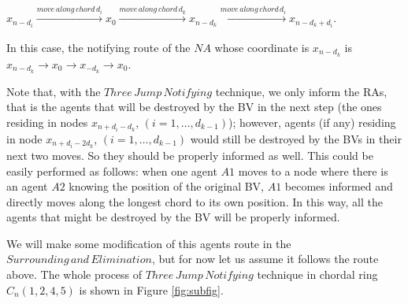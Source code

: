$x_{n-d_i}\xrightarrow [] {move\,along\,chord\,d_i}x_0\xrightarrow [] {move\,along\,chord\,d_k}x_{n-d_k}\xrightarrow []{move\,along\,chord\,d_i}x_{n-d_k+d_i}$.
 
 In this case, the notifying route of the $NA$ whose coordinate is $x_{n-d_k}$ is $x_{n-d_k}{\rightarrow}x_0{\rightarrow}x_{-d_k}{\rightarrow}x_0$.
 
Note that, with the $Three\,Jump\,Notifying$ technique, we only inform the RAs, that is the agents that will be destroyed by the BV in the next step (the ones residing in nodes $x_{n+d_i-d_k}$, $(i=1,\ldots, d_{k-1})$); however,  agents (if any) residing in node $x_{n+d_i-2d_k}$, $(i=1,\ldots, d_{k-1})$ would still be destroyed by the BVs in their next two moves. So they should be properly informed as well. This could be easily performed as follows: when one agent $A1$ moves to a node where there is an agent $A2$ knowing the position of the original BV, $A1$ becomes    informed and directly moves along the longest chord to its own position. 
In this way, all the agents that might be destroyed by the BV will be properly informed.
 
 
 We  will make some modification of this agents route in the $Surrounding\,and\,Elimination$, but for now let us assume it   follows the route above. The whole process of  $Three\,Jump\,Notifying$ technique in chordal ring $C_n(1, 2, 4, 5)$ is shown in Figure \ref{fig:subfig}. \\

%



